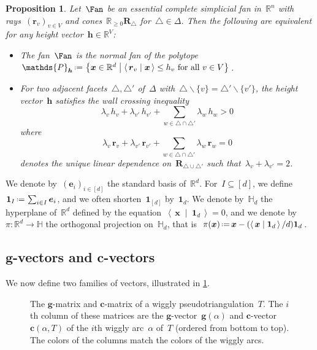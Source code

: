 \documentclass{amsart}
\newtheorem{proposition}[theorem]{Proposition}
\theoremstyle{definition}
\newcommand{\R}{\mathbb{R}} %
\newcommand{\HH}{\mathbb{H}} %
\renewcommand{\b}[1]{{\boldsymbol{#1}}} %
\newcommand{\set}[2]{\left\{ #1 \;\middle|\; #2 \right\}} %
\newcommand{\ssm}{\smallsetminus} %
\newcommand{\dotprod}[2]{\left\langle \, #1 \; \middle| \; #2 \, \right\rangle} %
\newcommand{\one}{\b{1}} %
\newcommand{\eqdef}{\mbox{\,\raisebox{0.2ex}{\scriptsize\ensuremath{\mathrm:}}\ensuremath{=}\,}} %
\newcommand{\darkblue}{\color{darkblue}} %
\newcommand{\defn}[1]{\textsl{\darkblue #1}} %
\newcommand{\polytope}[1]{\mathds{#1}} %
\begin{document}
\begin{proposition}
\label{prop:characterizationPolytopalFan}
Let~$\Fan$ be an essential complete simplicial fan in~$\R^n$ with rays~$(\b{r}_v)_{v \in V}$ and cones~$\R_{\ge 0} \b{R}_\triangle$ for~$\triangle \in \Delta$.
Then the following are equivalent for any height vector~$\b{h} \in \R^V$:
\begin{itemize}
\item The fan~$\Fan$ is the normal fan of the polytope~$\polytope{P}_{\b{h}} \eqdef \set{\b{x} \in \R^d}{\dotprod{\b{r}_v}{\b{x}} \le h_v \text{ for all } v \in V}$.
\item For two adjacent facets~$\triangle, \triangle'$ of~$\Delta$ with~$\triangle \ssm \{v\} = \triangle' \ssm \{v'\}$, the height vector~$\b{h}$ satisfies the \defn{wall crossing inequality}
\[
\lambda_v \, h_v + \lambda_{v'} \, h_{v'} + \sum_{w \in \triangle \cap \triangle'} \lambda_w \, h_w > 0
\]
where
\[
\lambda_v \, \b{r}_v + \lambda_{v'} \, \b{r}_{v'} + \sum_{w \in \triangle \cap \triangle'} \lambda_w \, \b{r}_w = 0
\]
denotes the unique linear dependence on~$\b{R}_{\triangle \cup \triangle'}$ such that~$\lambda_v + \lambda_{v'} = 2$.
\end{itemize}
\end{proposition}

We denote by~$(\b{e}_i)_{i \in [d]}$ the standard basis of~$\R^d$.
For~$I \subseteq [d]$, we define~$\one_I \eqdef \sum_{i \in I} \b{e}_i$, and we often shorten~$\one_{[d]}$ by~$\one_d$.
We denote by~$\HH_d$ the hyperplane of~$\R^d$ defined by the equation~$\dotprod{\b{x}}{\one_d} = 0$, and we denote by~$\pi : \R^d \to \HH$ the orthogonal projection on~$\HH_d$, that is~$\pi(\b{x}) \eqdef \b{x} - (\dotprod{\b{x}}{\one_d} / d) \one_d$.


\subsection{$\b{g}$-vectors and $\b{c}$-vectors}
\label{subsec:gcvectors}

We now define two families of vectors, illustrated in \cref{fig:pseudotriangulationMatrices}.
%
\begin{figure}
\centerline{ \quad }
\caption{The $\b{g}$-matrix and $\b{c}$-matrix of a wiggly pseudotriangulation~$T$. The $i$th column of these matrices are the $\b{g}$-vector~$\b{g}(\alpha)$ and $\b{c}$-vector~$\b{c}(\alpha, T)$ of the $i$th wiggly arc~$\alpha$ of~$T$ (ordered from bottom to top). The colors of the columns match the colors of the wiggly arcs.}
\label{fig:pseudotriangulationMatrices}
\end{figure}
\end{document}
